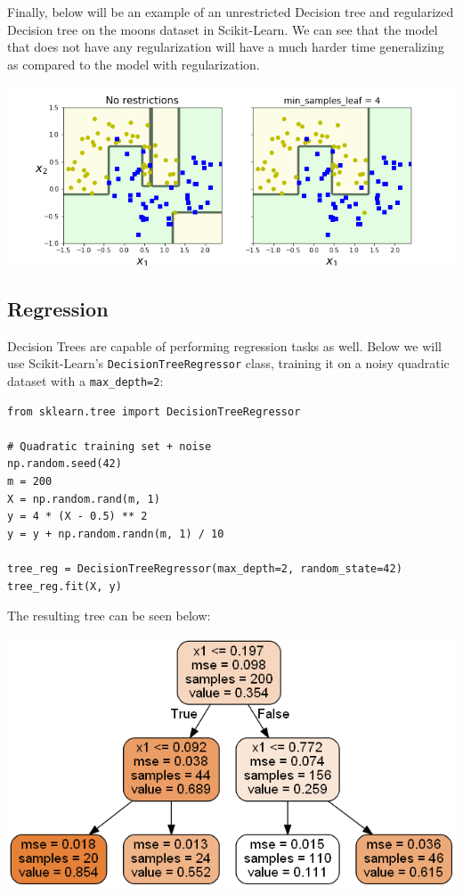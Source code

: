 \noindent
Finally, below will be an example of an unrestricted Decision tree and regularized Decision tree on the moons dataset in Scikit-Learn. We can see
that the model that does not have any regularization will have a much harder time generalizing as compared to the model with regularization.

\begin{center}
\includegraphics[scale=0.55]{Images/min_samples_leaf_plot.png}
\end{center}

\subsection{Regression}

Decision Trees are capable of performing regression tasks as well. Below we will use Scikit-Learn's \texttt{DecisionTreeRegressor}
class, training it on a noisy quadratic dataset with a \texttt{max_depth=2}:

\begin{verbatim}
from sklearn.tree import DecisionTreeRegressor

# Quadratic training set + noise
np.random.seed(42)
m = 200
X = np.random.rand(m, 1)
y = 4 * (X - 0.5) ** 2
y = y + np.random.randn(m, 1) / 10

tree_reg = DecisionTreeRegressor(max_depth=2, random_state=42)
tree_reg.fit(X, y)
\end{verbatim}

\noindent
The resulting tree can be seen below:

\begin{center}
\includegraphics[scale=0.45]{Images/iris_tree_reg.png}
\end{center}

